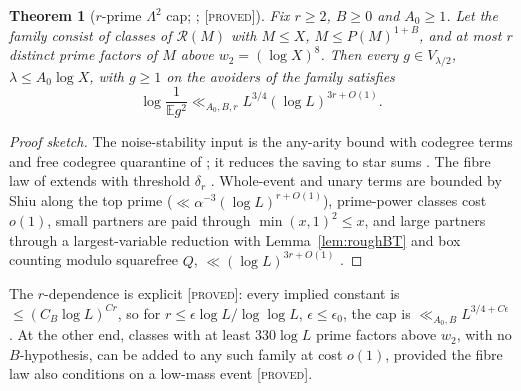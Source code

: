 \documentclass[10pt,reqno]{amsart}
\newtheorem{theorem}{Theorem}[section]
\theoremstyle{definition}
\theoremstyle{remark}
\newcommand{\cR}{\mathscr R}
\newcommand{\E}{\mathbb E}
\newcommand{\lab}[1]{\textup{[\textsc{#1}]}}
\begin{document}
\begin{theorem}[$r$-prime $\Lambda^2$ cap; {\cite[Thm~7.1]{TW4}}; \lab{proved}]\label{thm:rprime}
Fix $r\geq2$, $B\geq0$ and $A_0\geq1$.  Let the family consist of classes
of $\cR(M)$ with $M\leq X$, $M\leq P(M)^{1+B}$, and at most $r$ distinct
prime factors of $M$ above $w_2=(\log X)^8$.  Then every $g\in V_{\lambda/2}$,
$\lambda\leq A_0\log X$, with $g\geq1$ on the avoiders of the family satisfies
\[
 \log\frac1{\E g^2}\ll_{A_0,B,r}L^{3/4}(\log L)^{3r+O(1)}.
\]
\end{theorem}
\begin{proof}[Proof sketch]
The noise-stability input is the any-arity bound with codegree terms and
free codegree quarantine of \cite[Lemmas~6.1, 6.2]{TW3}; it reduces the
saving to star sums \cite[Prop.~3.1]{TW4}.  The fibre law of
\cite[\S3]{TW2} extends with threshold $\delta_r$ \cite[Lemma~4.1]{TW4}.
Whole-event and unary terms are bounded by Shiu along the top prime
($\ll\alpha^{-3}(\log L)^{r+O(1)}$), prime-power classes cost $o(1)$, small
partners are paid through $\min(x,1)^2\leq x$, and large partners through
a largest-variable reduction with Lemma~\ref{lem:roughBT} and box counting
modulo squarefree $Q$, $\ll(\log L)^{3r+O(1)}$
\cite[\S\S5--6]{TW4}.
\end{proof}

The $r$-dependence is explicit \cite[Prop.~9.1]{TW4} \lab{proved}: every
implied constant is $\leq(C_B\log L)^{Cr}$, so for $r\leq\epsilon\log L/\log\log L$,
$\epsilon\leq\epsilon_0$, the cap is $\ll_{A_0,B}L^{3/4+C\epsilon}$.  At the other end,
classes with at least $330\log L$ prime factors above $w_2$, with no
$B$-hypothesis, can be added to any such family at cost $o(1)$, provided
the fibre law also conditions on a low-mass event \cite[Lemma~9.2,
Cor.~9.3]{TW4} \lab{proved}.
\end{document}
